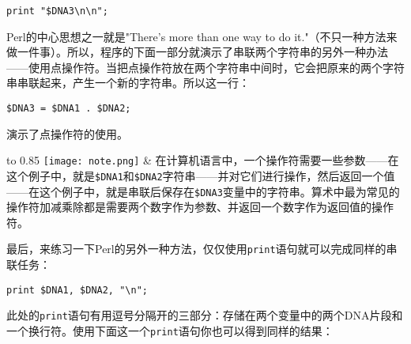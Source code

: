 \begin{lstlisting}
print "$DNA3\n\n";
\end{lstlisting}

Perl的中心思想之一就是"There's more than one way to do
it."（不只一种方法来做一件事）。所以，程序的下面一部分就演示了串联两个字符串的另外一种办法——使用点操作符。当把点操作符放在两个字符串中间时，它会把原来的两个字符串串联起来，产生一个新的字符串。所以这一行：

\begin{lstlisting}
$DNA3 = $DNA1 . $DNA2;
\end{lstlisting}
演示了点操作符的使用。


\vspace{-5pt}
\begin{table}[h]
  \begin{center}
    \begin{tabu*} to 0.85\linewidth {|X[1,r,m]X[15,l,m]|}
      \tabucline{-}
      \texttt{[image: note.png]} & 在计算机语言中，一个操作符需要一些参数——在这个例子中，就是\verb|$DNA1|和\verb|$DNA2|字符串——并对它们进行操作，然后返回一个值——在这个例子中，就是串联后保存在\verb|$DNA3|变量中的字符串。算术中最为常见的操作符加减乘除都是需要两个数字作为参数、并返回一个数字作为返回值的操作符。\\
      \tabucline{-}
    \end{tabu*}
  \end{center}
\end{table}
\vspace{-20pt}

最后，来练习一下Perl的另外一种方法，仅仅使用\verb|print|语句就可以完成同样的串联任务：

\begin{lstlisting}
print $DNA1, $DNA2, "\n";
\end{lstlisting}

此处的\verb|print|语句有用逗号分隔开的三部分：存储在两个变量中的两个DNA片段和一个换行符。使用下面这一个\verb|print|语句你也可以得到同样的结果：

